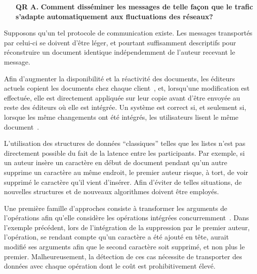 \begin{itemize}
  \begin{itemize}
  \item [\textbf{QR A.}] \textbf{Comment disséminer les messages de telle façon
      que le trafic s'adapte automatiquement aux fluctuations des réseaux?}
  \end{itemize}

  Supposons qu'un tel protocole de communication existe. Les messages
  transportés par celui-ci se doivent d'être léger, et pourtant suffisamment
  descriptifs pour réconstruire un document identique indépendemment de l'auteur
  recevant le message.

  Afin d'augmenter la disponibilité et la réactivité des documents, les éditeurs
  actuels copient les documents chez chaque client~\cite{saito2005optimistic},
  et, lorsqu'une modification est effectuée, elle est directement appliquée sur
  leur copie avant d'être envoyée au reste des éditeurs où elle est intégrée. Un
  système est correct si, et seulement si, lorsque les même changements ont été
  intégrés, les utilisateurs lisent le même document~\cite{shapiro2011conflict}.

  L'utilisation des structures de données ``classiques'' telles que les listes
  n'est pas directement possible du fait de la latence entre les
  participants. Par exemple, si un auteur insère un caractère en début de
  document pendant qu'un autre supprime un caractère au même endroit, le premier
  auteur risque, à tort, de voir supprimé le caractère qu'il vient
  d'insérer. Afin d'éviter de telles situations, de nouvelles structures et de
  nouveaux algorithmes doivent être employés.

  Une première famille d'approches consiste à transformer les arguments de
  l'opérations afin qu'elle considère les opérations intégrées
  concurremment~\cite{sun1998operational}. Dans l'exemple précédent, lors de
  l'intégration de la suppression par le premier auteur, l'opération, se rendant
  compte qu'un caractère a été ajouté en tête, aurait modifié ses arguments afin
  que le second caractère soit supprimé, et non plus le
  premier. Malheureusement, la détection de ces cas nécessite de transporter des
  données avec chaque opération dont le coût est prohibitivement
  élevé.


\end{itemize}
